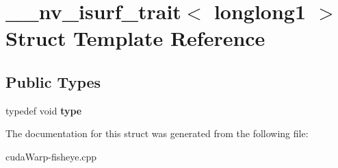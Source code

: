 \hypertarget{struct____nv__isurf__trait_3_01longlong1_01_4}{}\section{\+\_\+\+\_\+nv\+\_\+isurf\+\_\+trait$<$ longlong1 $>$ Struct Template Reference}
\label{struct____nv__isurf__trait_3_01longlong1_01_4}
\subsection*{Public Types}
\begin{DoxyCompactItemize}
\item 
typedef void {\bfseries type}\hypertarget{struct____nv__isurf__trait_3_01longlong1_01_4_a54654b793f69c59bdbf1ae24b5700b02}{}\label{struct____nv__isurf__trait_3_01longlong1_01_4_a54654b793f69c59bdbf1ae24b5700b02}

\end{DoxyCompactItemize}


The documentation for this struct was generated from the following file\+:\begin{DoxyCompactItemize}
\item 
cuda\+Warp-\/fisheye.\+cpp\end{DoxyCompactItemize}
